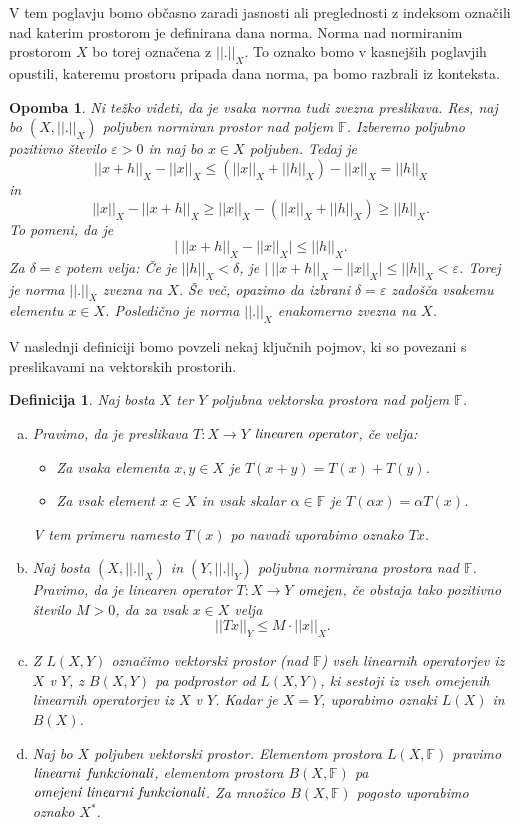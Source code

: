 \documentclass[12pt,a4paper,oneside,fleqn,openany]{book}
\newtheorem{definicija}[izrek]{Definicija}
\newtheorem{opomba}[izrek]{Opomba}
\newcommand{\F}{\mathbb{F}}
\newcommand{\abs}[1]{\ensuremath{\lvert #1 \rvert}}
\newcommand{\norm}[1]{\abs{\abs{#1}}}
\newcommand{\pojem}[1]{\ensuremath{\emph{#1}}}
\newcommand{\map}[3]{\ensuremath{{#1}:{#2}\rightarrow{#3}}}
\begin{document}
V tem poglavju bomo občasno zaradi jasnosti ali preglednosti z indeksom označili nad katerim prostorom je definirana dana norma. Norma nad normiranim prostorom $X$ bo torej označena z $\norm{.}_X$. To oznako bomo v kasnejših poglavjih opustili, kateremu prostoru pripada dana norma, pa bomo razbrali iz konteksta.

\begin{opomba}
	\label{opomb:normzv} 
	Ni težko videti, da je vsaka norma tudi zvezna preslikava. Res, naj bo $(X, \norm{.}_X)$ poljuben normiran prostor nad poljem $\F$. Izberemo poljubno pozitivno število $\varepsilon>0$ in naj bo $x\in X$ poljuben. Tedaj je $$\norm{x+h}_X - \norm{x}_X \leq (\norm{x}_X + \norm{h}_X) - \norm{x}_X = \norm{h}_X$$ in $$\norm{x}_X - \norm{x+h}_X \geq \norm{x}_X - (\norm{x}_X + \norm{h}_X) \geq \norm{h}_X.$$ To pomeni, da je $$\abs{~\norm{x+h}_X - \norm{x}_X} \leq \norm{h}_X.$$ Za $\delta=\varepsilon$ potem velja: Če je $\norm{h}_X<\delta$, je $\abs{~\norm{x+h}_X - \norm{x}_X} \leq \norm{h}_X < \varepsilon$. Torej je norma $\norm{.}_X$ zvezna na $X$. Še več, opazimo da izbrani $\delta=\varepsilon$ zadošča vsakemu elementu $x\in X$. Posledično je norma $\norm{.}_X$ enakomerno zvezna na $X$.
\end{opomba}
V naslednji definiciji bomo povzeli nekaj ključnih pojmov, ki so povezani s preslikavami na vektorskih prostorih.
\begin{definicija}
	\label{def:linop}
	Naj bosta $X$ ter $Y$ poljubna vektorska prostora nad poljem $\F$. \begin{enumerate}[a)]
		\item Pravimo, da je preslikava $\map{T}{X}{Y}$ \pojem{linearen operator}, če velja: \begin{itemize}
			\item Za vsaka elementa $x, y\in X$ je $T(x+y) = T(x) + T(y)$.
			\item Za vsak element $x\in X$ in vsak skalar $\alpha\in\F$ je $T(\alpha x)=\alpha T(x)$.
		\end{itemize} V tem primeru namesto $T(x)$ po navadi uporabimo oznako $Tx$. 
		\item Naj bosta $(X, \norm{.}_X)$ in $(Y, \norm{.}_Y)$ poljubna normirana prostora nad $\F$. Pravimo, da je linearen operator $\map{T}{X}{Y}$ \pojem{omejen}, če obstaja tako pozitivno število $M>0$, da za vsak $x\in X$ velja $$\norm{Tx}_Y\leq M\cdot\norm{x}_X.$$
		\item Z $L(X, Y)$ označimo vektorski prostor (nad $\F$) vseh linearnih operatorjev iz $X$ v $Y$, z $B(X, Y)$ pa podprostor od $L(X, Y)$, ki sestoji iz vseh omejenih linearnih operatorjev iz $X$ v $Y$. Kadar je $X=Y$, uporabimo oznaki $L(X)$ in $B(X)$.
		\item Naj bo $X$ poljuben vektorski prostor. Elementom prostora $L(X, \F)$ pravimo \pojem{linearni} \pojem{funkcionali}, elementom prostora $B(X, \F)$ pa \pojem{omejeni linearni funkcionali}. Za množico $B(X, \F)$ pogosto uporabimo oznako $X^*$.
	\end{enumerate}
\end{definicija}
\end{document}
